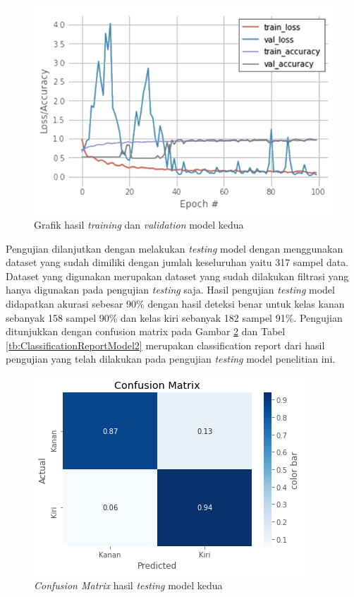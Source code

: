 \begin{figure}[H]
  \centering
  \includegraphics[scale=0.75]{gambar/belakang w.jpg}
  \caption{Grafik hasil \emph{training} dan \emph{validation} model kedua}
  \label{fig:HasilTrainingValidationModel2}
\end{figure}

Pengujian dilanjutkan dengan melakukan \emph{testing} model dengan menggunakan dataset yang sudah dimiliki dengan jumlah keseluruhan yaitu 317 sampel data. Dataset yang digunakan merupakan dataset yang sudah dilakukan filtrasi yang hanya digunakan pada pengujian \emph{testing} saja. Hasil pengujian \emph{testing} model didapatkan akurasi sebesar 90\% dengan hasil deteksi benar untuk kelas kanan sebanyak 158 sampel 90\% dan kelas kiri sebanyak 182 sampel 91\%. Pengujian ditunjukkan dengan confusion matrix pada Gambar \ref{fig:HasilTestingModel2} dan Tabel \ref{tb:ClassificationReportModel2} merupakan classification report dari hasil pengujian yang telah dilakukan pada pengujian \emph{testing} model penelitian ini.

\begin{figure}[H]
  \centering
  \includegraphics[scale=1]{gambar/cm model belakang.png}
  \caption{\emph{Confusion Matrix} hasil \emph{testing} model kedua}
  \label{fig:HasilTestingModel2}
\end{figure}

